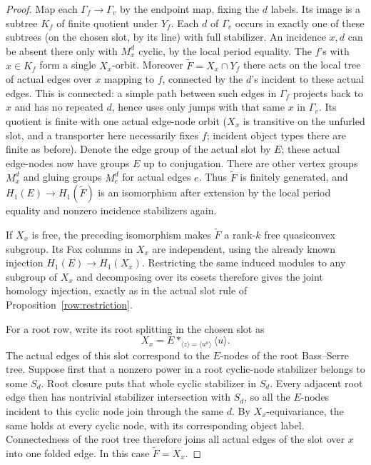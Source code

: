 \begin{proof}
Map each \(\Gamma_f\to\Gamma_v\) by the endpoint map, fixing the \(d\) labels. Its image is a subtree \(K_f\) of finite quotient under \(Y_f\). Each \(d\) of \(\Gamma_v\) occurs in exactly one of these subtrees (on the chosen slot, by its line) with full stabilizer. An incidence \(x,d\) can be absent there only with \(M_x^d\) cyclic, by the local period equality. The \(f\)'s with \(x\in K_f\) form a single \(X_x\)-orbit. Moreover \(\widetilde F=X_x\cap Y_f\) there acts on the local tree of actual edges over \(x\) mapping to \(f\), connected by the \(d\)'s incident to these actual edges. This is connected: a simple path between such edges in \(\Gamma_f\) projects back to \(x\) and has no repeated \(d\), hence uses only jumps with that same \(x\) in \(\Gamma_v\). Its quotient is finite with one actual edge-node orbit (\(X_x\) is transitive on the unfurled slot, and a transporter here necessarily fixes \(f\); incident object types there are finite as before). Denote the edge group of the actual slot by \(E\); these actual edge-nodes now have groups \(E\) up to conjugation. There are other vertex groups \(M_x^d\) and gluing groups \(M_e^d\) for actual edges \(e\). Thus \(\widetilde F\) is finitely generated, and \(H_1(E)\to H_1(\widetilde F)\) is an isomorphism after extension by the local period equality and nonzero incidence stabilizers again.

If $X_x$ is free, the preceding isomorphism makes
$\widetilde F$ a rank-$k$ free quasiconvex subgroup. Its Fox columns
in $X_x$ are independent, using the already known injection
$H_1(E)\to H_1(X_x)$. Restricting the same induced modules to any
subgroup of $X_x$ and decomposing over its cosets therefore gives
the joint homology injection, exactly as in the actual slot rule
of Proposition~\ref{row:restriction}.

For a root row, write its root splitting in the chosen slot as
\[
 X_x=E*_{\langle z\rangle=\langle u^a\rangle}\langle u\rangle.
\]
The actual edges of this slot correspond to the $E$-nodes of the
root Bass--Serre tree. Suppose first that a nonzero power in a root
cyclic-node stabilizer belongs to some $S_d$. Root closure puts
that whole cyclic stabilizer in $S_d$. Every adjacent root edge
then has nontrivial stabilizer intersection with $S_d$, so all the
$E$-nodes incident to this cyclic node join through the same $d$.
By $X_x$-equivariance, the same holds at every cyclic node, with
its corresponding object label. Connectedness of the root tree
therefore joins all actual edges of the slot over $x$ into one
folded edge. In this case $\widetilde F=X_x$.


\end{proof}
